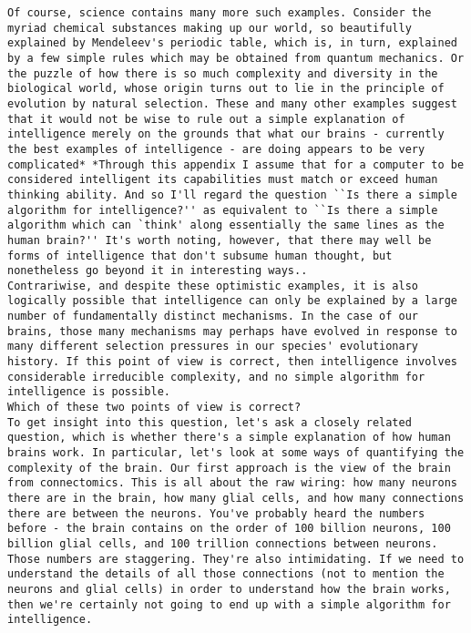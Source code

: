 \begin{lstlisting}
Of course, science contains many more such examples. Consider the myriad chemical substances making up our world, so beautifully explained by Mendeleev's periodic table, which is, in turn, explained by a few simple rules which may be obtained from quantum mechanics. Or the puzzle of how there is so much complexity and diversity in the biological world, whose origin turns out to lie in the principle of evolution by natural selection. These and many other examples suggest that it would not be wise to rule out a simple explanation of intelligence merely on the grounds that what our brains - currently the best examples of intelligence - are doing appears to be very complicated* *Through this appendix I assume that for a computer to be considered intelligent its capabilities must match or exceed human thinking ability. And so I'll regard the question ``Is there a simple algorithm for intelligence?'' as equivalent to ``Is there a simple algorithm which can `think' along essentially the same lines as the human brain?'' It's worth noting, however, that there may well be forms of intelligence that don't subsume human thought, but nonetheless go beyond it in interesting ways..
Contrariwise, and despite these optimistic examples, it is also logically possible that intelligence can only be explained by a large number of fundamentally distinct mechanisms. In the case of our brains, those many mechanisms may perhaps have evolved in response to many different selection pressures in our species' evolutionary history. If this point of view is correct, then intelligence involves considerable irreducible complexity, and no simple algorithm for intelligence is possible.
Which of these two points of view is correct?
To get insight into this question, let's ask a closely related question, which is whether there's a simple explanation of how human brains work. In particular, let's look at some ways of quantifying the complexity of the brain. Our first approach is the view of the brain from connectomics. This is all about the raw wiring: how many neurons there are in the brain, how many glial cells, and how many connections there are between the neurons. You've probably heard the numbers before - the brain contains on the order of 100 billion neurons, 100 billion glial cells, and 100 trillion connections between neurons. Those numbers are staggering. They're also intimidating. If we need to understand the details of all those connections (not to mention the neurons and glial cells) in order to understand how the brain works, then we're certainly not going to end up with a simple algorithm for intelligence.

\end{lstlisting}
